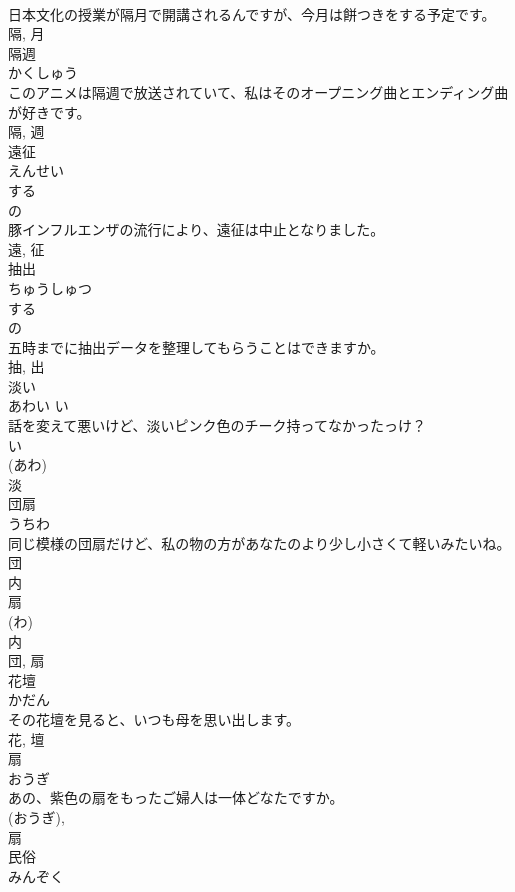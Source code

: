 \documentclass[8pt]{extreport}
\begin{document}
\begin{CJK}{UTF8}{min}
\\	日本文化の授業が隔月で開講されるんですが、今月は餅つきをする予定です。	
\\	隔, 月	
\\	隔週	
\\	かくしゅう	
\\	このアニメは隔週で放送されていて、私はそのオープニング曲とエンディング曲が好きです。	
\\	隔, 週	
\\	遠征	
\\	えんせい	
\\	する 
\\	の 
\\	豚インフルエンザの流行により、遠征は中止となりました。	
\\	遠, 征	
\\	抽出	
\\	ちゅうしゅつ	
\\	する 
\\	の 
\\	五時までに抽出データを整理してもらうことはできますか。	
\\	抽, 出	
\\	淡い	
\\	あわい	い 
\\	話を変えて悪いけど、淡いピンク色のチーク持ってなかったっけ？	
\\	い 
\\	(あわ) 
\\	淡	
\\	団扇	
\\	うちわ	
\\	同じ模様の団扇だけど、私の物の方があなたのより少し小さくて軽いみたいね。	
\\	団 
\\	内
\\	扇 
\\	(わ) 
\\	内 
\\	団, 扇	
\\	花壇	
\\	かだん	
\\	その花壇を見ると、いつも母を思い出します。	
\\	花, 壇	
\\	扇	
\\	おうぎ	
\\	あの、紫色の扇をもったご婦人は一体どなたですか。	
\\	(おうぎ), 
\\	扇	
\\	民俗	
\\	みんぞく	

\end{CJK}
\end{document}
